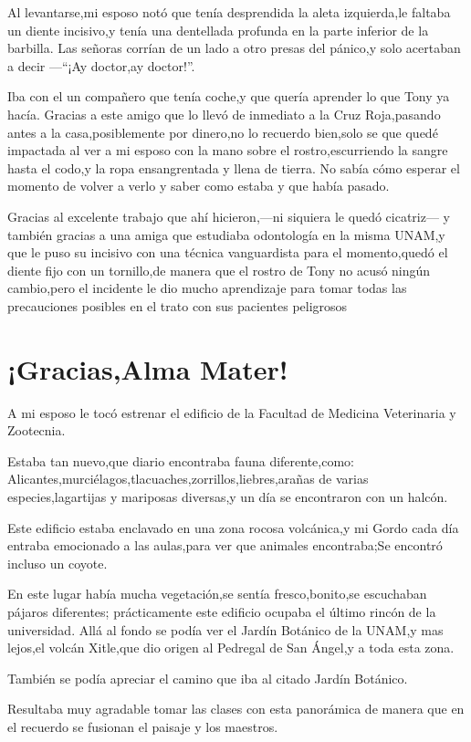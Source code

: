 \documentclass[letterpaper,12pt]{book}
\begin{document}
 Al levantarse,mi esposo notó que tenía desprendida la aleta izquierda,le faltaba un diente incisivo,y tenía una dentellada profunda en la parte inferior de la barbilla. Las señoras corrían de un lado a otro presas del pánico,y solo acertaban a decir ---``¡Ay doctor,ay doctor!''.

Iba con el un compañero que tenía coche,y que quería aprender lo que Tony ya hacía. Gracias a este amigo que lo llevó de inmediato a la Cruz Roja,pasando antes a la casa,posiblemente por dinero,no lo recuerdo bien,solo se que quedé impactada al ver a mi esposo con la mano sobre el rostro,escurriendo la sangre hasta el codo,y la ropa ensangrentada y llena de tierra.
No sabía cómo esperar el momento de volver a verlo y saber como estaba y que había pasado.

Gracias al excelente trabajo que ahí hicieron,---ni siquiera le quedó cicatriz--- y también gracias a una amiga que estudiaba odontología en la misma UNAM,y que le puso su incisivo con una técnica vanguardista para el momento,quedó el diente fijo con un tornillo,de manera que el rostro de Tony no acusó ningún  cambio,pero el incidente le dio mucho aprendizaje para tomar todas las precauciones posibles en el trato con sus pacientes peligrosos
\chapter{¡Gracias,Alma Mater!}
A mi esposo le tocó estrenar el edificio de la Facultad de Medicina Veterinaria y Zootecnia. 

Estaba tan nuevo,que diario encontraba fauna diferente,como: Alicantes,murciélagos,tlacuaches,zorrillos,liebres,arañas de varias especies,lagartijas y mariposas diversas,y un día se encontraron con un halcón.

Este edificio estaba enclavado en una zona rocosa volcánica,y mi Gordo cada día entraba emocionado a las aulas,para ver que animales encontraba;Se encontró incluso un coyote.

En este lugar había mucha vegetación,se sentía fresco,bonito,se escuchaban pájaros diferentes; prácticamente este edificio ocupaba el último rincón de la universidad.
Allá al fondo se podía ver el Jardín Botánico de la UNAM,y mas lejos,el volcán Xitle,que dio origen al Pedregal de San Ángel,y a toda esta zona.

También se podía apreciar el camino que iba al citado Jardín Botánico.

Resultaba muy agradable tomar las clases con esta panorámica de manera que en el recuerdo se fusionan el paisaje y los maestros.
\end{document}
